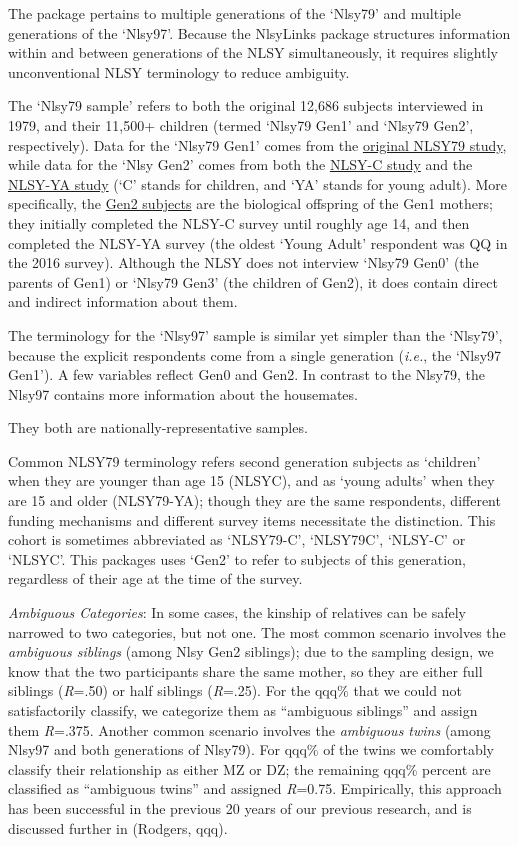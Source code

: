 \documentclass[smallextended]{svjour3}       %
\begin{document}
The package pertains to multiple generations of the `Nlsy79' and
multiple generations of the `Nlsy97'. Because the NlsyLinks package
structures information within and between generations of the NLSY
simultaneously, it requires slightly unconventional NLSY terminology to
reduce ambiguity.

The `Nlsy79 sample' refers to both the original 12,686 subjects
interviewed in 1979, and their 11,500+ children (termed `Nlsy79 Gen1'
and `Nlsy79 Gen2', respectively). Data for the `Nlsy79 Gen1' comes from
the \href{http://www.bls.gov/nls/nlsy79.htm}{original NLSY79 study},
while data for the `Nlsy Gen2' comes from both the \href{}{NLSY-C study}
and the \href{}{NLSY-YA study} (`C' stands for children, and `YA' stands
for young adult). More specifically, the
\href{http://www.bls.gov/nls/nlsy79ch.htm}{Gen2 subjects} are the
biological offspring of the Gen1 mothers; they initially completed the
NLSY-C survey until roughly age 14, and then completed the NLSY-YA
survey (the oldest `Young Adult' respondent was QQ in the 2016 survey).
Although the NLSY does not interview `Nlsy79 Gen0' (the parents of Gen1)
or `Nlsy79 Gen3' (the children of Gen2), it does contain direct and
indirect information about them.

The terminology for the `Nlsy97' sample is similar yet simpler than the
`Nlsy79', because the explicit respondents come from a single generation
(\emph{i.e.}, the `Nlsy97 Gen1'). A few variables reflect Gen0 and Gen2.
In contrast to the Nlsy79, the Nlsy97 contains more information about
the housemates.

They both are nationally-representative samples.

Common NLSY79 terminology refers second generation subjects as
`children' when they are younger than age 15 (NLSYC), and as `young
adults' when they are 15 and older (NLSY79-YA); though they are the same
respondents, different funding mechanisms and different survey items
necessitate the distinction. This cohort is sometimes abbreviated as
`NLSY79-C', `NLSY79C', `NLSY-C' or `NLSYC'. This packages uses `Gen2' to
refer to subjects of this generation, regardless of their age at the
time of the survey.

\emph{Ambiguous Categories}: In some cases, the kinship of relatives can
be safely narrowed to two categories, but not one. The most common
scenario involves the \emph{ambiguous siblings} (among Nlsy Gen2
siblings); due to the sampling design, we know that the two participants
share the same mother, so they are either full siblings (\emph{R}=.50)
or half siblings (\emph{R}=.25). For the qqq\% that we could not
satisfactorily classify, we categorize them as ``ambiguous siblings''
and assign them \emph{R}=.375. Another common scenario involves the
\emph{ambiguous twins} (among Nlsy97 and both generations of Nlsy79).
For qqq\% of the twins we comfortably classify their relationship as
either MZ or DZ; the remaining qqq\% percent are classified as
``ambiguous twins'' and assigned \emph{R}=0.75. Empirically, this
approach has been successful in the previous 20 years of our previous
research, and is discussed further in (Rodgers, qqq).
\end{document}
